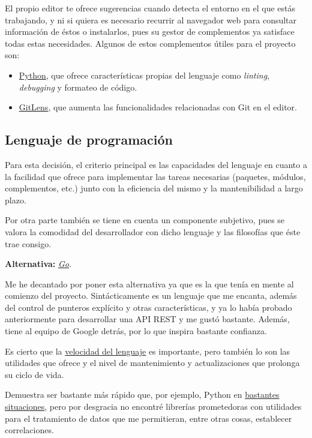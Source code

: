 El propio editor te ofrece sugerencias cuando detecta el entorno en el que estás trabajando, y ni si quiera es necesario recurrir al navegador web para consultar información de éstos o instalarlos, pues su gestor de complementos ya satisface todas estas necesidades. Algunos de estos complementos útiles para el proyecto son:
\begin{itemize}
    \item \href{https://marketplace.visualstudio.com/items?itemName=ms-python.python}{Python}, que ofrece características propias del lenguaje como \textit{linting}, \textit{debugging} y formateo de código.
    \item \href{https://marketplace.visualstudio.com/items?itemName=eamodio.gitlens}{GitLens}, que aumenta las funcionalidades relacionadas con Git en el editor.
\end{itemize}

\subsection{Lenguaje de programación}

Para esta decisión, el criterio principal es las capacidades del lenguaje en cuanto a la facilidad que ofrece para implementar las tareas necesarias (paquetes, módulos, complementos, etc.) junto con la eficiencia del mismo y la mantenibilidad a largo plazo.

Por otra parte también se tiene en cuenta un componente subjetivo, pues se valora la comodidad del desarrollador con dicho lenguaje y las filosofías que éste trae consigo.

\textbf{Alternativa:} \href{https://go.dev/}{\textit{Go}}.

Me he decantado por poner esta alternativa ya que es la que tenía en mente al comienzo del proyecto. Sintácticamente es un lenguaje que me encanta, además del control de punteros explícito y otras características, y ya lo había probado anteriormente para desarrollar una API REST y me gustó bastante. Además, tiene al equipo de Google detrás, por lo que inspira bastante confianza.

Es cierto que la \href{https://benchmarksgame-team.pages.debian.net/benchmarksgame/index.html}{velocidad del lenguaje} es importante, pero también lo son las utilidades que ofrece y el nivel de mantenimiento y actualizaciones que prolonga su ciclo de vida.

Demuestra ser bastante más rápido que, por ejemplo, Python en \href{https://benchmarksgame-team.pages.debian.net/benchmarksgame/fastest/go-python3.html}{bastantes situaciones}, pero por desgracia no encontré librerías prometedoras con utilidades para el tratamiento de datos que me permitieran, entre otras cosas, establecer correlaciones.

